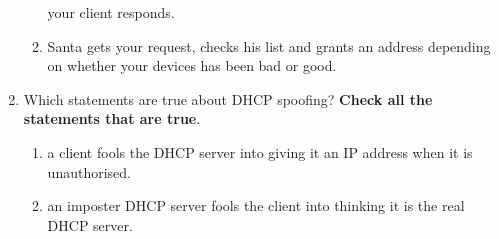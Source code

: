 \documentclass{article} %
\newcommand{\incorrectOption}{\textbf{\Circle}}
\begin{document}
\begin{enumerate}[leftmargin=*, label=\textbf{Q\arabic*}, itemsep=-5pt]
\begin{enumerate}[itemsep=-3.5pt, label={}]
    your client responds. 
  \item[\incorrectOption] Santa gets your request, checks his list and
    grants an address depending on whether your devices has been bad
    or good. 
  \end{enumerate}    
%
  \item Which statements are true about DHCP spoofing? \textbf{Check all the
    statements that are true}.
  \begin{enumerate}[itemsep=-3.5pt, label={}]
    \item[\incorrectOption]  a client fools the DHCP server into
      giving it an IP address when it is unauthorised.
%
    \item[\incorrectOption]  an imposter DHCP server fools the client
      into thinking it is the real DHCP server.
  \end{enumerate}
  
\end{enumerate}
\end{document}
